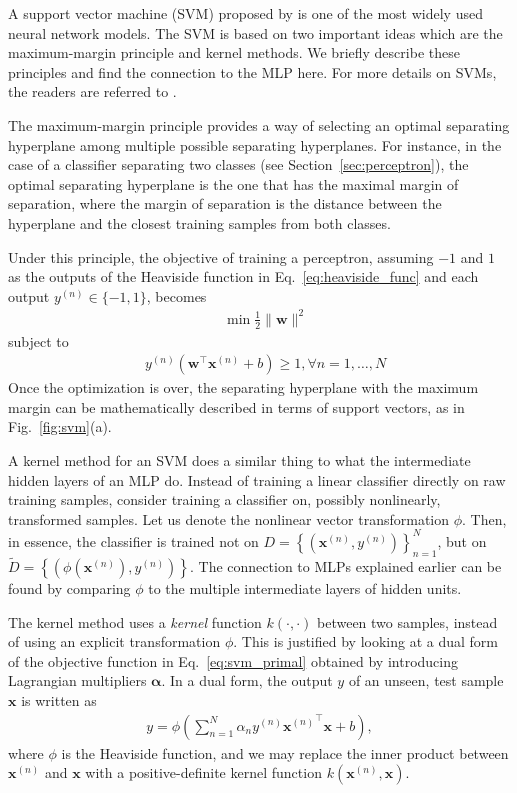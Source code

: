 \documentclass[dissertation,nocontribution]{aaltoseries}
\newcommand{\vect}[1]{\mathbf{#1}}
\newcommand{\vects}[1]{\boldsymbol{#1}}
\newcommand{\vx}[0]{\vect{x}}
\newcommand{\vw}[0]{\vect{w}}
\newcommand{\valpha}[0]{\vects{\alpha}}
\begin{document}
A support vector machine (SVM) proposed by
\citet{Cortes1995} is one of the most widely used neural
network models. The SVM is based on two important ideas
which are the maximum-margin principle and kernel methods.
We briefly describe these principles and find the
connection to the MLP here.  For more details on SVMs, the
readers are referred to \citep{Scholkopf2001}.

The maximum-margin principle provides a way of selecting an
optimal separating hyperplane among multiple possible separating
hyperplanes.
For instance, in the
case of a classifier separating two classes (see
Section~\ref{sec:perceptron}), the optimal separating
hyperplane is the one that has the maximal margin of separation,
where the margin of separation is the distance between the
hyperplane and the closest training samples from both
classes.

Under this principle, the objective of training a
perceptron, assuming $-1$ and $1$ as the outputs of the
Heaviside function in Eq.~\eqref{eq:heaviside_func} and each
output $y^{(n)} \in \{ -1, 1 \}$, becomes
\begin{align}
    \label{eq:svm_primal}
    &\min \frac{1}{2} \| \vw \|^2
\end{align}
subject to
\begin{align*}
    &y^{(n)} \left( \vw^\top \vx^{(n)} + b \right) \geq 1,
    \forall n = 1, \dots , N
\end{align*}
Once the optimization is over, the separating hyperplane
with the maximum margin can be mathematically described in
terms of support vectors, as in Fig.~\ref{fig:svm}(a).

A kernel method 
for an SVM does a similar thing to what the intermediate hidden
layers of an MLP do. Instead of training a linear classifier
directly on raw training samples, consider training a classifier
on, possibly nonlinearly, transformed samples. Let us denote the
nonlinear vector transformation $\phi$. Then, in essence,
the classifier is trained not on $D = \left\{ \left(
\vx^{(n)}, y^{(n)} \right) \right\}_{n=1}^N$, but on
$\tilde{D} = \left\{ \left( \phi(\vx^{(n)}), y^{(n)} \right)
\right\}$. The connection to MLPs explained earlier can be found
by comparing $\phi$ to the multiple intermediate layers of hidden
units.

The kernel method uses a \textit{kernel} function $k(\cdot,
        \cdot)$ between two samples, instead of using an explicit
transformation $\phi$.  This is justified by looking at a dual
form of the objective function in Eq.~\eqref{eq:svm_primal}
obtained by introducing Lagrangian multipliers $\valpha$.  In a
dual form, the output $y$ of an unseen, test sample $\vx$ is
written as
\begin{align*}
    y = \phi \left( \sum_{n=1}^N \alpha_n y^{(n)}
    {\vx^{(n)}}^\top \vx + b \right),
\end{align*}
where $\phi$ is the Heaviside function,
and we may replace the inner product between $\vx^{(n)}$ and
$\vx$  with a positive-definite kernel function
$k(\vx^{(n)}, \vx)$.
\end{document}
